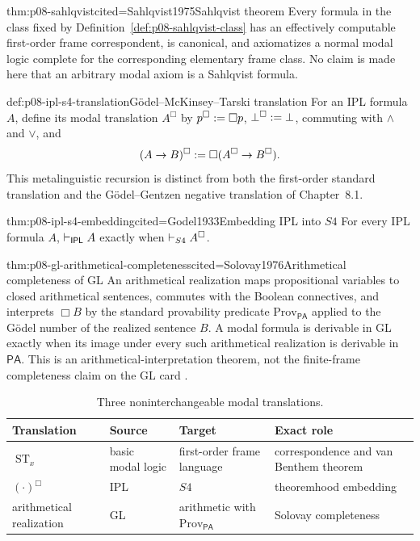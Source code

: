 \begin{hbtheorem}{thm:p08-sahlqvist}{cited=Sahlqvist1975}{Sahlqvist theorem}
Every formula in the class fixed by
Definition~\ref{def:p08-sahlqvist-class} has an effectively computable
first-order frame correspondent, is canonical, and axiomatizes a normal modal
logic complete for the corresponding elementary frame class.  No claim is
made here that an arbitrary modal axiom is a Sahlqvist formula.
\end{hbtheorem}

\begin{hbdefinition}{def:p08-ipl-s4-translation}{G\"odel--McKinsey--Tarski translation}
For an IPL formula \(A\), define its modal translation \(A^{\Box}\) by
\(p^{\Box}\mathrel{:=}\Box p\), \(\bot^{\Box}\mathrel{:=}\bot\), commuting with
\(\land\) and \(\lor\), and
\[
 (A\to B)^{\Box}\mathrel{:=}\Box(A^{\Box}\to B^{\Box}).
\]
This metalinguistic recursion is distinct from both the first-order standard
translation and the G\"odel--Gentzen negative translation of Chapter~8.1.
\end{hbdefinition}

\begin{hbtheorem}{thm:p08-ipl-s4-embedding}{cited=Godel1933}{Embedding IPL into \(S4\)}
For every IPL formula \(A\),
\(\vdash_{\mathsf{IPL}}A\) exactly when
\(\vdash_{S4}A^{\Box}\).
\end{hbtheorem}

\begin{hbtheorem}{thm:p08-gl-arithmetical-completeness}{cited=Solovay1976}{Arithmetical completeness of GL}
An arithmetical realization maps propositional variables to closed
arithmetical sentences, commutes with the Boolean connectives, and interprets
\(\Box B\) by the standard provability predicate
\(\mathrm{Prov}_{\mathsf{PA}}\) applied to the G\"odel number of the realized
sentence \(B\).  A modal formula is derivable in GL exactly when its image
under every such arithmetical realization is derivable in \(\mathsf{PA}\).  This is an
arithmetical-interpretation theorem, not the finite-frame completeness claim on
the GL card \cite{Boolos1993}.
\end{hbtheorem}

\begin{table}[!htbp]
\centering
\small
\begin{tabular}{@{}p{}p{}p{}p{}@{}}
\toprule
Translation & Source & Target & Exact role \\
\midrule
\(\operatorname{ST}_x\) & basic modal logic & first-order frame language &
correspondence and van Benthem theorem \\
\((\cdot)^{\Box}\) & IPL & \(S4\) & theoremhood embedding \\
arithmetical realization & GL & arithmetic with \(\mathrm{Prov}_{\mathsf{PA}}\) &
Solovay completeness \\
\bottomrule
\end{tabular}
\caption{Three noninterchangeable modal translations.}
\label{tab:p08-modal-translations}
\end{table}

